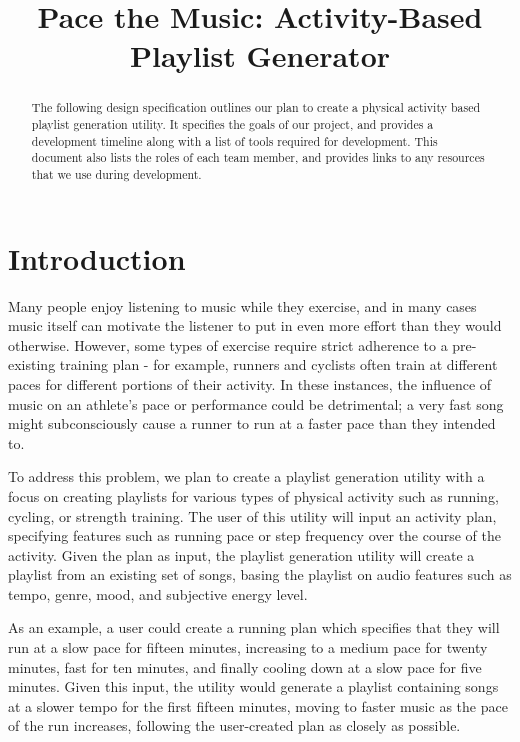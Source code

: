 \documentclass{article}
\title{Pace the Music: Activity-Based Playlist Generator}
\begin{document}
%
\maketitle
%
\begin{abstract}
The following design specification outlines our plan to create a physical activity based playlist generation utility. It specifies the goals of our project, and provides a development timeline along with a list of tools required for development. This document also lists the roles of each team member, and provides links to any resources that we use during development.
\end{abstract}
%
\section{Introduction}
Many people enjoy listening to music while they exercise, and in many cases music itself can motivate the listener to put in even more effort than they would otherwise. \cite{Shivar} However, some types of exercise require strict adherence to a pre-existing training plan - for example, runners and cyclists often train at different paces for different portions of their activity. In these instances, the influence of music on an athlete’s pace or performance could be detrimental; a very fast song might subconsciously cause a runner to run at a faster pace than they intended to.

To address this problem, we plan to create a playlist generation utility with a focus on creating playlists for various types of physical activity such as running, cycling, or strength training. The user of this utility will input an activity plan, specifying features such as running pace or step frequency over the course of the activity. Given the plan as input, the playlist generation utility will create a playlist from an existing set of songs, basing the playlist on audio features such as tempo, genre, mood, and subjective energy level.

As an example, a user could create a running plan which specifies that they will run at a slow pace for fifteen minutes, increasing to a medium pace for twenty minutes, fast for ten minutes, and finally cooling down at a slow pace for five minutes. Given this input, the utility would generate a playlist containing songs at a slower tempo for the first fifteen minutes, moving to faster music as the pace of the run increases, following the user-created plan as closely as possible.
\end{document}
